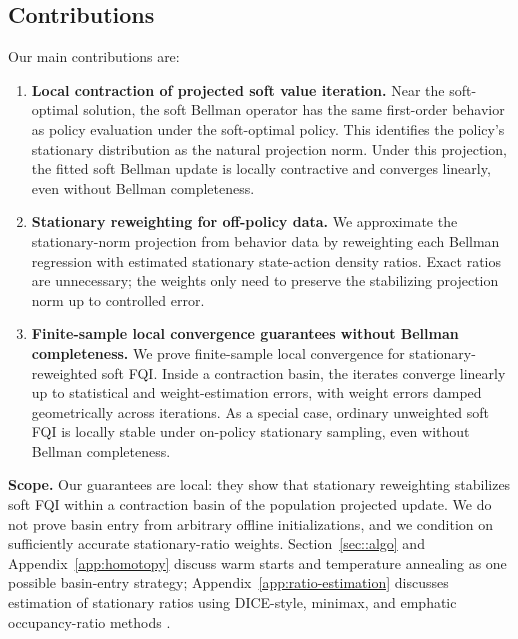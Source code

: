 \documentclass{article}
\theoremstyle{plain}
\theoremstyle{definition}
\theoremstyle{remark}
\begin{document}
\subsection{Contributions}

Our main contributions are:
\vspace{-0.25cm}
\begin{enumerate}[leftmargin=1.5em]

\item \textbf{Local contraction of projected soft value iteration.}
Near the soft-optimal solution, the soft Bellman operator has the same
first-order behavior as policy evaluation under the soft-optimal policy. This
identifies the policy's stationary distribution as the natural projection norm.
Under this projection, the fitted soft Bellman update is locally contractive and
converges linearly, even without Bellman completeness.

\item \textbf{Stationary reweighting for off-policy data.}
We approximate the stationary-norm projection from behavior data by reweighting
each Bellman regression with estimated stationary state-action density ratios.
Exact ratios are unnecessary; the weights only need to preserve the stabilizing
projection norm up to controlled error.

\item \textbf{Finite-sample local convergence guarantees without Bellman completeness.}
We prove finite-sample local convergence for stationary-reweighted soft FQI\@.
Inside a contraction basin, the iterates converge linearly up to statistical and
weight-estimation errors, with weight errors damped geometrically across
iterations. As a special case, ordinary unweighted soft FQI is locally stable under
on-policy stationary sampling, even without Bellman completeness.

\end{enumerate}
\vspace{-0.25cm}

\textbf{Scope.}
Our guarantees are local: they show that stationary reweighting stabilizes soft
FQI within a contraction basin of the population projected update. We do not
prove basin entry from arbitrary offline initializations, and we condition on
sufficiently accurate stationary-ratio weights. Section~\ref{sec::algo} and
Appendix~\ref{app:homotopy} discuss warm starts and temperature annealing as one possible
basin-entry strategy; Appendix~\ref{app:ratio-estimation} discusses estimation of stationary ratios using DICE-style, minimax, and emphatic occupancy-ratio methods
\citep{liu2018breaking,nachum2019dualdice,zhang2020gendice,
uehara2020minimax,sutton2016emphatic,hallak2016generalized}.
\end{document}
